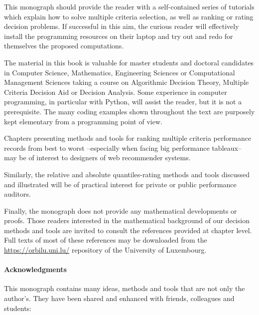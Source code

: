 
This monograph should provide the reader with a self-contained series of tutorials which explain how to solve multiple criteria selection, as well as ranking or rating decision problems. If successful in this aim, the curious reader will effectively install the \Digraph programming resources on their laptop and try out and redo for themselves the proposed computations.


The material in this book is valuable for master students and doctoral candidates in Computer Science, Mathematics, Engineering Sciences or Computational Management Sciences taking a course on Algorithmic Decision Theory, Multiple Criteria Decision Aid or Decision Analysis. Some experience in computer programming, in particular with Python, will assist the reader, but it is not a prerequisite. The many coding examples shown throughout the text are purposely kept elementary from a programming point of view. 

Chapters presenting methods and tools for ranking multiple criteria performance records from best to worst --especially when facing big performance tableaux-- may be of interest to designers of web recommender systems. 

Similarly, the relative and absolute quantiles-rating methods and tools discussed and illustrated will be of practical interest for private or public performance auditors.

Finally, the monograph does not provide any mathematical developments or proofs. Those readers interested in the mathematical background of our decision methods and tools are invited to consult the references provided at chapter level. Full texts of most of these references may be downloaded from the \href{https://orbilu.uni.lu/}{https://orbilu.uni.lu/} repository of the University of Luxembourg. 

\paragraph{Acknowledgments}

This monograph contains many ideas, methods and tools that are not only the author’s. They have been shared and enhanced with friends, colleagues and students: 

